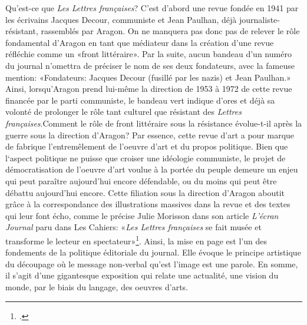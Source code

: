 Qu'est-ce que \emph{Les Lettres françaises}? C'est d'abord une revue fondée en 1941 par les écrivains Jacques Decour, communiste et Jean Paulhan, déjà journaliste-résistant, rassemblés par Aragon. On ne manquera pas donc pas de relever le rôle fondamental d'Aragon en tant que médiateur dans la création d'une revue réfléchie comme un «front littéraire». Par la suite, aucun bandeau d'un numéro du journal n'omettra de préciser le nom de ses deux fondateurs, avec la fameuse mention: «Fondateurs: Jacques Decour (fusillé par les nazis) et Jean Paulhan.» Ainsi, lorsqu'Aragon prend lui-même la direction de 1953 à 1972 de cette revue financée par le parti communiste, le bandeau vert indique d'ores et déjà sa volonté de prolonger le rôle tant culturel que résistant des \emph{Lettres françaises}.Comment le rôle de front littéraire sous la résistance évolue-t-il après la guerre sous la direction d'Aragon? Par essence, cette revue d'art a pour marque de fabrique l'entremêlement de l'oeuvre d'art et du propos politique. Bien que l‘aspect politique ne puisse que croiser une idéologie communiste, le projet de démocratisation de l'oeuvre d'art voulue à la portée du peuple demeure un enjeu qui peut paraître aujourd'hui encore défendable, ou du moins qui peut être débattu aujourd'hui encore. Cette filiation sous la direction d'Aragon aboutit grâce à la correspondance des illustrations massives dans la revue et des textes qui leur font écho, comme le précise Julie Morisson dans son article \emph{L'écran Journal} paru dans Les Cahiers: «\emph{Les Lettres françaises} se fait musée et transforme le lecteur en spectateur»\footcite[]{cahiers}. Ainsi, la mise en page est l'un des fondements de la politique éditoriale du journal. Elle évoque le principe artistique du découpage où le message non-verbal qu'est l'image est une parole. En somme, il s'agit d'une gigantesque exposition qui relate une actualité, une vision du monde, par le biais du langage, des oeuvres d'arts.